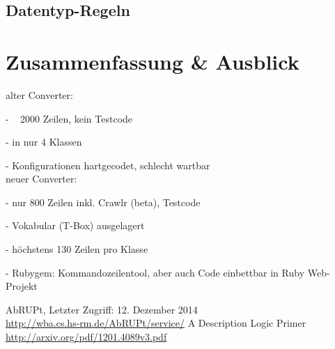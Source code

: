 \documentclass[runningheads,a4paper]{llncs}
\begin{document}
\subsection{Datentyp-Regeln}

\section{Zusammenfassung \& Ausblick}
alter Converter:

- ~ 2000 Zeilen, kein Testcode

- in nur 4 Klassen

- Konfigurationen hartgecodet, schlecht wartbar
\\
neuer Converter:

- nur 800 Zeilen inkl. Crawlr (beta), Testcode

- Vokabular (T-Box) ausgelagert

- höchstens 130 Zeilen pro Klasse

- Rubygem: Kommandozeilentool, aber auch Code einbettbar in Ruby Web-Projekt





\begin{thebibliography}{4}

AbRUPt,
Letzter Zugriff: 12. Dezember 2014\\
\url{http://wba.cs.hs-rm.de/AbRUPt/service/}
A Description Logic Primer\\
\url{http://arxiv.org/pdf/1201.4089v3.pdf}

\end{thebibliography}
\end{document}
